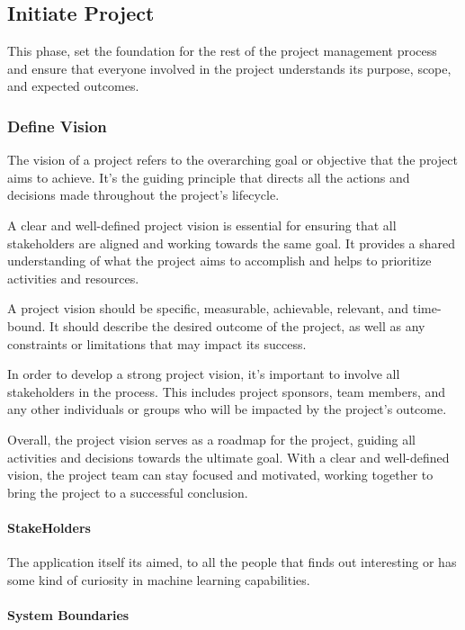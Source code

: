 \subsection{Initiate Project}

This phase, set the foundation for the rest of the project management process and ensure that everyone involved in the project understands its purpose, scope, and expected outcomes.


\subsubsection{Define Vision}
The vision of a project refers to the overarching goal or objective that the project aims to achieve. It's the guiding principle that directs all the actions and decisions made throughout the project's lifecycle.

A clear and well-defined project vision is essential for ensuring that all stakeholders are aligned and working towards the same goal. It provides a shared understanding of what the project aims to accomplish and helps to prioritize activities and resources.

A project vision should be specific, measurable, achievable, relevant, and time-bound. It should describe the desired outcome of the project, as well as any constraints or limitations that may impact its success.

In order to develop a strong project vision, it's important to involve all stakeholders in the process. This includes project sponsors, team members, and any other individuals or groups who will be impacted by the project's outcome.

Overall, the project vision serves as a roadmap for the project, guiding all activities and decisions towards the ultimate goal. With a clear and well-defined vision, the project team can stay focused and motivated, working together to bring the project to a successful conclusion.
 
\paragraph{StakeHolders}
 The application itself its aimed, to all the people that finds out interesting or has some kind of curiosity in machine learning capabilities.
 
\paragraph{System Boundaries}

